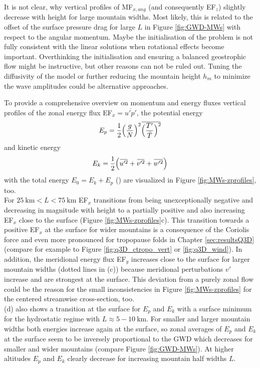 It is not clear, why vertical profiles of MF$_{x,ang}$ (and consequently EF$_z$) slightly decrease with height for large mountain widths. Most likely, this is related to the offset of the surface pressure drag for large $L$ in Figure \ref{fig:GWD-MWs} with respect to the angular momentum. Maybe the initialisation of the problem is not fully consistent with the linear solutions when rotational effects become important. Overthinking the initialisation and ensuring a balanced geostrophic flow might be instructive, but other reasons can not be ruled out. Tuning the diffusivity of the model or further reducing the mountain height $h_m$ to minimize the wave amplitudes could be alternative approaches.

To provide a comprehensive overview on momentum and energy fluxes vertical profiles of the zonal energy flux EF$_x = \overbar{u'p'}$, the potential energy 
\begin{equation}
    E_p = \frac{1}{2} \Bigl(\frac{g}{N}\Bigr)^2 \overbar{\Bigl(\frac{T'}{\bar{T}}\Bigr)^2}
    \label{equ:epot-density}
\end{equation}
and kinetic energy
\begin{equation}
    E_k = \frac{1}{2} \Bigl(\overbar{u'^2} + \overbar{v'^2} + \overbar{w'^2}\Bigr)
    \label{equ:ekin-density}
\end{equation}
with the total energy $E_0 = E_k + E_p$ (\cite[]{tsuda_global_2000}) are visualized in Figure \ref{fig:MWs-zprofiles}, too.\\
For $ \SI{25}{\kilo\meter} < L < \SI{75}{\kilo\meter}$ EF$_x$ transitions from being unexceptionally negative and decreasing in magnitude with height to a partially positive and also increasing EF$_x$ close to the surface (Figure \ref{fig:MWs-zprofiles}c). This transition towards a positive EF$_x$ at the surface for wider mountains is a consequence of the Coriolis force and even more pronounced for tropopause folds in Chapter \ref{sec:resultsQ3D} (compare for example to Figure \ref{fig:q3D_ctropo_vert} or \ref{fig:q3D_wind}). In addition, the meridional energy flux EF$_y$ increases close to the surface for larger mountain widths (dotted lines in (c)) because meridional perturbations $v'$ increase and are strongest at the surface. This deviation from a purely zonal flow could be the reason for the small inconsistencies in Figure \ref{fig:MWs-zprofiles} for the centered streamwise cross-section, too.\\
(d) also shows a transition at the surface for $E_p$ and $E_k$ with a surface minimum for the hydrostatic regime with $L \approx 5-\SI{10}{\kilo\meter}$. For smaller and larger mountain widths both energies increase again at the surface, so zonal averages of $E_p$ and $E_k$ at the surface seem to be inversely proportional to the GWD which decreases for smaller and wider mountains (compare Figure \ref{fig:GWD-MWs}). At higher altitudes $E_p$ and $E_k$ clearly decrease for increasing mountain half widths $L$.\\ 
